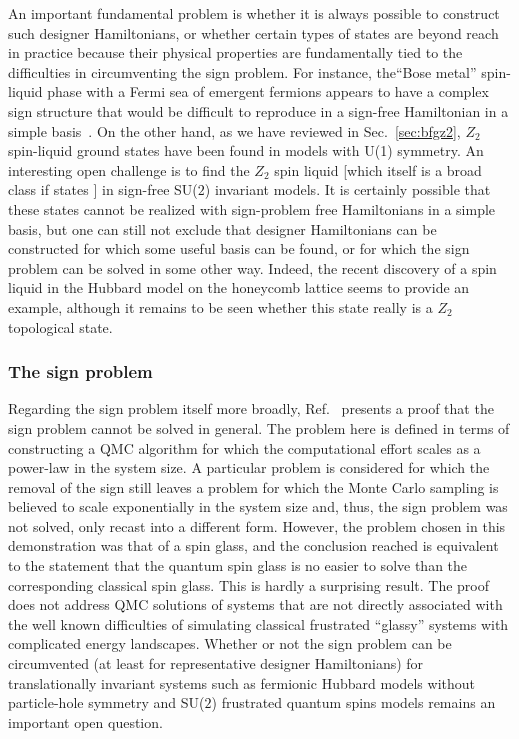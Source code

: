 \documentclass[10pt,pre,aps,twocolumn,showpacs,superscriptaddress,floatfix]{revtex4-1}
\begin{document}
An important fundamental problem is whether it is always possible to construct such designer Hamiltonians, or whether certain types of
states are beyond reach in practice because their physical properties are fundamentally tied to the difficulties in circumventing the sign problem.
For instance, the``Bose metal'' spin-liquid phase with a Fermi sea of emergent fermions appears to have a complex sign structure that  would be difficult
to reproduce in a sign-free Hamiltonian in a simple basis~\cite{motrunich2007:dbl}. On the other hand, as we have reviewed in Sec.~\ref{sec:bfgz2}, $Z_2$ spin-liquid
ground states have been found in models with U(1) symmetry. An interesting open challenge is to find  the $Z_2$ spin liquid [which itself is a broad class
if states \cite{Wen03}] in sign-free SU($2$) invariant models. It is certainly possible that these states cannot be realized with sign-problem free Hamiltonians
in a simple basis, but one can still not exclude that designer Hamiltonians can be constructed for which some useful basis can be found, or for which the
sign problem can be solved in some other way. Indeed, the recent discovery of a spin liquid in the Hubbard model on the honeycomb lattice \cite{Meng10} seems
to provide an example, although it remains to be seen whether this state really is a $Z_2$ topological state.

\subsubsection{The sign problem}

Regarding the sign problem itself more broadly, Ref.~\cite{Troyer05} presents a proof that the sign problem cannot be solved in general. 
The problem here is defined in terms of constructing a QMC algorithm for which the computational effort scales as a power-law in the system
size. A particular problem is considered for which the removal of the sign still leaves a problem for which the Monte Carlo sampling is believed 
to scale exponentially in the system size and, thus, the sign problem was not solved, only recast into a different form. However, the problem chosen in
this demonstration was that of a spin glass, and the conclusion reached is equivalent to the statement that the quantum spin glass is no easier 
to solve than the corresponding classical spin glass. This is hardly a surprising result. The proof does not address QMC solutions of systems that 
are not directly associated with the well known difficulties of simulating classical frustrated ``glassy'' systems with complicated energy 
landscapes. Whether or not the sign problem can be circumvented (at least for representative designer Hamiltonians) for translationally invariant 
systems such as fermionic Hubbard models without particle-hole symmetry and SU($2$) frustrated quantum spins models remains an important open question.
\end{document}
